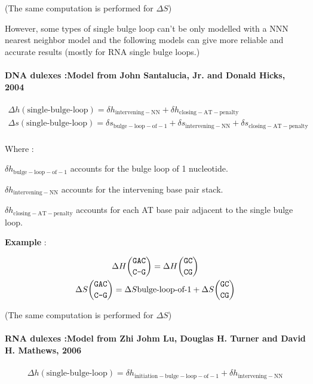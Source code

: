 \documentclass{article}
\begin{document}
       (The same computation is performed for $\Delta S$)   
  
 However, some types of single bulge loop can't be only modelled with a NNN nearest 
 neighbor model and the following models can give more reliable and accurate results (mostly
 for RNA single bulge loops.)  
  
\paragraph{DNA dulexes :\textbf{Model from John Santalucia, Jr. and Donald Hicks, 2004}} 

\begin{multline*}
\Delta h {(\mbox{single-bulge-loop})} =
\delta{}h_\mathrm{intervening-NN} +
\delta{}h_\mathrm{closing-AT-penalty}\\
\Delta s {(\mbox{single-bulge-loop})} =
\delta{}s_\mathrm{bulge-loop-of-1} +
\delta{}s_\mathrm{intervening-NN} +
\delta{}s_\mathrm{closing-AT-penalty}\\
\end{multline*}


Where :

$\delta{}h_\mathrm{bulge-loop-of-1}$ accounts for the bulge loop of 1 nucleotide.

$\delta{}h_\mathrm{intervening-NN}$ accounts for the intervening base pair stack.

$\delta{}h_\mathrm{closing-AT-penalty}$ accounts for each AT base pair adjacent
to the single bulge loop.

\textbf{Example} :

\begin{multline*}
\Delta H {\mbox{\texttt{GAC}} \choose \mbox{\texttt{C-G}}} =
\Delta H {\mbox{\texttt{GC}} \choose \mbox{\texttt{CG}}} \\
\Delta S {\mbox{\texttt{GAC}} \choose \mbox{\texttt{C-G}}} =
\Delta S {\mbox{bulge-loop-of-1}} +
\Delta S {\mbox{\texttt{GC}} \choose \mbox{\texttt{CG}}} \\
\end{multline*}

       (The same computation is performed for $\Delta S$) 

\paragraph{RNA dulexes :\textbf{Model from Zhi Johm Lu, Douglas H. Turner and David H. Mathews, 2006}} 

\begin{multline*}
\Delta h {(\mbox{single-bulge-loop})} =
\delta{}h_\mathrm{initiation-bulge-loop-of-1} +
\delta{}h_\mathrm{intervening-NN} \\
\end{multline*}
\end{document}
